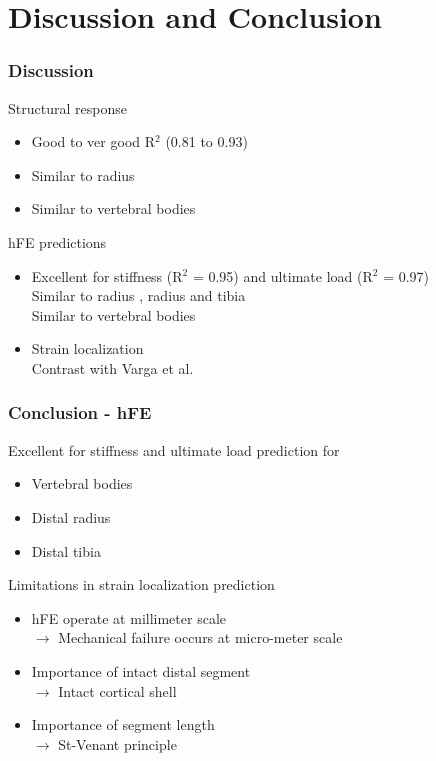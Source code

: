 \documentclass[xcolor=table,11pt]{beamer}
\begin{document}
	
	\section{Discussion and Conclusion}

	\begin{frame}
		\frametitle{Discussion}

		Structural response
		\begin{itemize}
			\item Good to ver good R$^2$ (0.81 to 0.93)
			\item Similar to radius \cite{p8}\cite{p9}
			\item Similar to vertebral bodies \cite{p10}\cite{p11}
		\end{itemize}

		\vfill

		hFE predictions
		\begin{itemize}
			\item Excellent for stiffness (R$^2$ = 0.95) and ultimate load (R$^2$ = 0.97)\\Similar to radius \cite{p9}, radius and tibia \cite{p13}\\Similar to vertebral bodies \cite{p10}
			\item Strain localization\\Contrast with Varga et al. \cite{p7}
		\end{itemize}

	\end{frame}
	
	\begin{frame}
		\frametitle{Conclusion - hFE}
		Excellent for stiffness and ultimate load prediction for
		\begin{itemize}
			\item Vertebral bodies
			\item Distal radius
			\item Distal tibia
		\end{itemize}
		
		\vspace{5mm}

		Limitations in strain localization prediction
		\begin{itemize}
			\item hFE operate at millimeter scale\\$\rightarrow$ Mechanical failure occurs at micro-meter scale
			\item Importance of intact distal segment\\$\rightarrow$ Intact cortical shell
			\item Importance of segment length\\$\rightarrow$ St-Venant principle
		\end{itemize}

	\end{frame}
	
\end{document}
